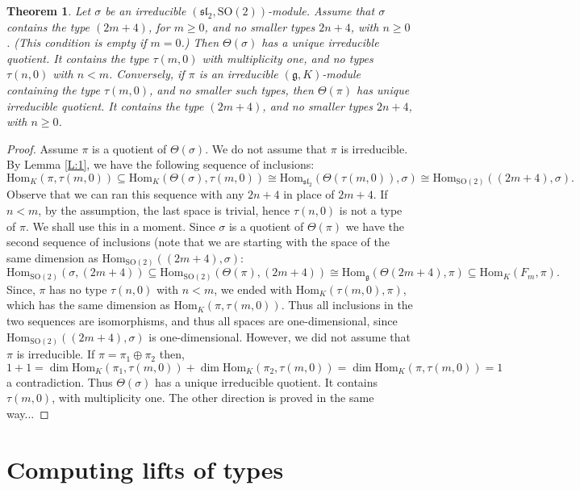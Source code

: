 \documentclass[11pt]{amsart}
\theoremstyle{plain}
\newtheorem{thm}[equation]{Theorem}
\numberwithin{equation}{section}
\newcommand{\Hom}{{\mathrm{Hom}}}
\newcommand{\SO}{{\mathrm{SO}}}
\begin{document}
\begin{thm} Let $\sigma$ be an irreducible $(\mathfrak{sl}_2,\SO(2))$-module. Assume that $\sigma$ contains the type $(2m+4)$, for $m\geq 0$, and no smaller types $2n+4$, with $n\geq 0$. 
 (This condition is empty if $m=0$.) Then $\Theta(\sigma)$ has a unique irreducible quotient. It contains the type $\tau(m,0)$ with multiplicity one, and no types $\tau(n,0)$ with $n<m$. 
Conversely, if $\pi$ is an irreducible $(\mathfrak g,K)$-module containing the type $\tau(m,0)$, and 
no smaller such types, then $\Theta(\pi)$ has unique irreducible quotient. It contains the type $(2m+4)$, and no smaller types $2n+4$, with $n\geq 0$. 
\end{thm} 
\begin{proof}  Assume $\pi$ is a quotient of $\Theta(\sigma)$. We do not assume that $\pi$ is irreducible. By Lemma \ref{L:1}, we have the following sequence of inclusions: 
\[ 
\Hom_K(\pi, \tau(m,0)) \subseteq \Hom_K(\Theta(\sigma), \tau(m,0))  \cong \Hom_{\mathfrak{sl}_2} (\Theta(\tau(m,0)), \sigma) \cong \Hom_{\SO(2)} ((2m+4) , \sigma). 
\] 
Observe that we can ran this sequence with any $2n+4$ in place of $2m+4$. If $n<m$, by the assumption, the last space is trivial, hence $\tau(n,0)$ is not a type of 
$\pi$. We shall use this in a moment. 
Since $\sigma$ is a quotient of $\Theta(\pi)$ we have the second sequence of inclusions (note that we are starting with the space of the same dimension as 
$\Hom_{\SO(2)} ((2m+4) , \sigma)$: 
\[ 
\Hom_{\SO(2)}(\sigma, (2m+4)) \subseteq \Hom_{\SO(2)}(\Theta(\pi), (2m+4))  \cong \Hom_{\mathfrak g} (\Theta(2m+4), \pi) \subseteq  \Hom_{K} (F_m , \pi). 
\] 
Since, $\pi$ has no type $\tau(n,0)$ with $n<m$, we ended with  $\Hom_{K} (\tau(m,0) , \pi)$, which has  the same dimension as $\Hom_K(\pi, \tau(m,0))$. 
Thus all inclusions in the two sequences  are isomorphisms, and thus all spaces are one-dimensional, since $\Hom_{\SO(2)} ((2m+4) , \sigma)$ is one-dimensional. 
However, we did not assume that $\pi$ is irreducible. If $\pi=\pi_1\oplus \pi_2$ then, 
\[ 
1+1 = \dim \Hom_{K}(\pi_1,   \tau(m,0)) + \dim\Hom_{K}(\pi_2,  \tau(m,0)) = \dim  \Hom_{K}(\pi, \tau(m,0))=1
\] 
a contradiction. Thus $\Theta(\sigma)$ has a unique irreducible quotient. It contains $\tau(m,0)$, with multiplicity one.  The other direction is proved in the same way... 
\end{proof} 



\section{Computing lifts of types} 
\end{document}

